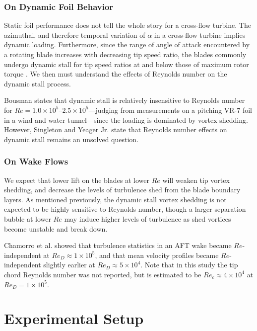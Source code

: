 \documentclass[energies,article,accept,moreauthors,pdftex,12pt,a4paper]{mdpi}
\begin{document}
\subsubsection{On Dynamic Foil Behavior}

Static foil performance does not tell the whole story for a cross-flow turbine.
The azimuthal, and therefore temporal variation of $\alpha$ in a cross-flow
turbine implies dynamic loading. Furthermore, since the range of angle of attack
encountered by a rotating blade increases with decreasing tip speed ratio, the
blades commonly undergo dynamic stall for tip speed ratios at and below those of
maximum rotor torque \cite{Para2002}. We then must understand the effects of
Reynolds number on the dynamic stall process.

Bousman \cite{Bousman2000-evaluation} states that dynamic stall is relatively
insensitive to Reynolds number for $Re=1.0 \times 10^5$--$2.5 \times
10^5$---judging from measurements on a pitching VR-7 foil in a wind and water
tunnel---since the loading is dominated by vortex shedding. However, Singleton
and Yeager Jr. \cite{Singleton2000} state that Reynolds number effects on
dynamic stall remains an unsolved question.


\subsubsection{On Wake Flows}

We expect that lower lift on the blades at lower $Re$ will weaken tip vortex
shedding, and decrease the levels of turbulence shed from the blade boundary
layers. As mentioned previously, the dynamic stall vortex shedding is not
expected to be highly sensitive to Reynolds number, though a larger separation
bubble at lower $Re$ may induce higher levels of turbulence as shed vortices
become unstable and break down.

Chamorro et al. \cite{Chamorro2012} showed that turbulence statistics in an AFT
wake became $Re$-independent at $Re_D \approx 1 \times 10^5$, and that mean
velocity profiles became $Re$-independent slightly earlier at $Re_D \approx 5
\times 10^4$. Note that in this study the tip chord Reynolds number was not
reported, but is estimated to be $Re_c \approx 4 \times 10^4$ at $Re_D=1 \times
10^5$.


\section{Experimental Setup}
\end{document}
